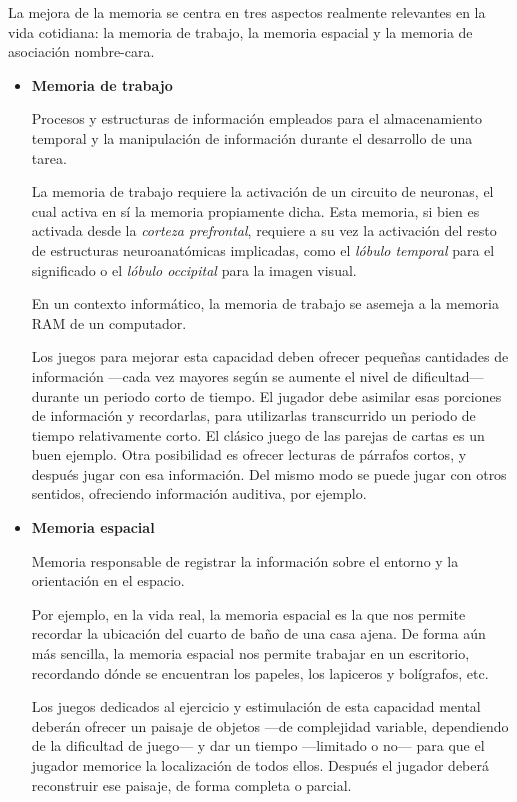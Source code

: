 La mejora de la memoria se centra en tres aspectos realmente relevantes en la vida cotidiana: la memoria de trabajo, la memoria espacial y la memoria de asociación nombre-cara.

\begin{itemize}
\item {\bf Memoria de trabajo}

Procesos y estructuras de información empleados para el almacenamiento temporal y la manipulación de información durante el desarrollo de una tarea.

La memoria de trabajo requiere la activación de un circuito de neuronas, el cual activa en sí la memoria propiamente dicha. Esta memoria, si bien es activada desde la {\it corteza prefrontal}, requiere a su vez la activación del resto de estructuras neuroanatómicas implicadas, como el \emph{lóbulo temporal} para el significado o el \emph{lóbulo occipital} para la imagen visual.

En un contexto informático, la memoria de trabajo se asemeja a la memoria RAM de un computador.

Los juegos para mejorar esta capacidad deben ofrecer pequeñas cantidades de información ---cada vez mayores según se aumente el nivel de dificultad--- durante un periodo corto de tiempo. El jugador debe asimilar esas porciones de información y recordarlas, para utilizarlas transcurrido un periodo de tiempo relativamente corto. El clásico juego de las parejas de cartas es un buen ejemplo. Otra posibilidad es ofrecer lecturas de párrafos cortos, y después jugar con esa información. Del mismo modo se puede jugar con otros sentidos, ofreciendo información auditiva, por ejemplo.

\item {\bf Memoria espacial}

Memoria responsable de registrar la información sobre el entorno y la orientación en el espacio.

Por ejemplo, en la vida real, la memoria espacial es la que nos permite recordar la ubicación del cuarto de baño de una casa ajena. De forma aún más sencilla, la memoria espacial nos permite trabajar en un escritorio, recordando dónde se encuentran los papeles, los lapiceros y bolígrafos, etc.

Los juegos dedicados al ejercicio y estimulación de esta capacidad mental deberán ofrecer un paisaje de objetos ---de complejidad variable, dependiendo de la dificultad de juego--- y dar un tiempo ---limitado o no--- para que el jugador memorice la localización de todos ellos. Después el jugador deberá reconstruir ese paisaje, de forma completa o parcial.


\end{itemize}
